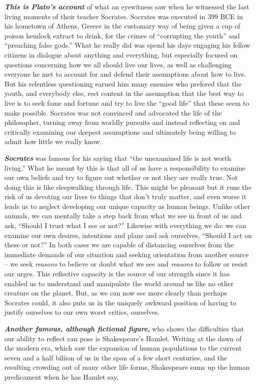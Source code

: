 \documentclass[12pt, openany]{book}
\begin{document}
\textbf{\emph{This is Plato's account}} of what an eyewitness saw when he witnessed the last living moments of their teacher Socrates. Socrates was executed in 399 BCE in his hometown of Athens, Greece in the customary way of being given a cup of poison hemlock extract to drink, for the crimes of ``corrupting the youth'' and ``preaching false gods.'' What he really did was spend his days engaging his fellow citizens in dialogue about anything and everything, but especially focused on questions concerning how we all should live our lives, as well as challenging everyone he met to account for and defend their assumptions about how to live. But his relentless questioning earned him many enemies who prefered that the youth, and everybody else, rest content in the assumption that the best way to live is to seek fame and fortune and try to live the ``good life'' that these seem to make possible. Socrates was not convinced and advocated the life of the philosopher, turning away from worldly pursuits and instead reflecting on and critically examining our deepest assumptions and ultimately being willing to admit how little we really know.

\textbf{\emph{Socrates}} was famous for his saying that ``the unexamined life is not worth living.'' What he meant by this is that all of us have a responsibility to examine our own beliefs and try to figure out whether or not they are really true. Not doing this is like sleepwalking through life. This might be pleasant but it runs the risk of us devoting our lives to things that don't truly matter, and even worse it leads us to neglect developing our unique capacity as human beings. Unlike other animals, we can mentally take a step back from what we see in front of us and ask, ``Should I trust what I see or not?'' Likewise with everything we do: we can examine our own desires, intentions and plans and ask ourselves, ``Should I act on these or not?'' In both cases we are capable of distancing ourselves from the immediate demands of our situation and seeking orientation from another source -- we seek \emph{reasons} to believe or doubt what we see and \emph{reasons} to follow or resist our urges. This reflective capacity is the source of our strength since it has enabled us to understand and manipulate the world around us like no other creature on the planet. But, as we can now see more clearly than perhaps Socrates could, it also puts us in the uniquely awkward position of having to justify ourselves to our own worst critics, ourselves.

\textbf{\emph{Another famous, although fictional figure},} who shows the difficulties that our ability to reflect can pose is Shakespeare's Hamlet. Writing at the dawn of the modern era, which saw the expansion of human populations to the current seven and a half biliion of us in the span of a few short centuries, and the resulting crowding out of many other life forms, Shakespeare sums up the human predicament when he has Hamlet say,
\end{document}
